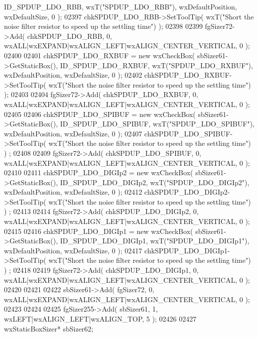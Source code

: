 \begin{DoxyCode}
      ID_SPDUP_LDO_RBB, wxT(\textcolor{stringliteral}{"SPDUP\_LDO\_RBB"}), wxDefaultPosition, wxDefaultSize, 0 );
02397     chkSPDUP_LDO_RBB->SetToolTip( wxT(\textcolor{stringliteral}{"Short the noise filter resistor to speed up the settling time"}) );
02398     
02399     fgSizer72->Add( chkSPDUP_LDO_RBB, 0, wxALL|wxEXPAND|wxALIGN\_LEFT|wxALIGN\_CENTER\_VERTICAL, 0 );
02400     
02401     chkSPDUP_LDO_RXBUF = \textcolor{keyword}{new} wxCheckBox( sbSizer61->GetStaticBox(), 
      ID_SPDUP_LDO_RXBUF, wxT(\textcolor{stringliteral}{"SPDUP\_LDO\_RXBUF"}), wxDefaultPosition, wxDefaultSize, 0 );
02402     chkSPDUP_LDO_RXBUF->SetToolTip( wxT(\textcolor{stringliteral}{"Short the noise filter resistor to speed up the settling time"}) );
02403     
02404     fgSizer72->Add( chkSPDUP_LDO_RXBUF, 0, wxALL|wxEXPAND|wxALIGN\_LEFT|wxALIGN\_CENTER\_VERTICAL, 0 );
02405     
02406     chkSPDUP_LDO_SPIBUF = \textcolor{keyword}{new} wxCheckBox( sbSizer61->GetStaticBox(), 
      ID_SPDUP_LDO_SPIBUF, wxT(\textcolor{stringliteral}{"SPDUP\_LDO\_SPIBUF"}), wxDefaultPosition, wxDefaultSize, 0 );
02407     chkSPDUP_LDO_SPIBUF->SetToolTip( wxT(\textcolor{stringliteral}{"Short the noise filter resistor to speed up the settling time"}) )
      ;
02408     
02409     fgSizer72->Add( chkSPDUP_LDO_SPIBUF, 0, wxALL|wxEXPAND|wxALIGN\_LEFT|wxALIGN\_CENTER\_VERTICAL, 0 );
02410     
02411     chkSPDUP_LDO_DIGIp2 = \textcolor{keyword}{new} wxCheckBox( sbSizer61->GetStaticBox(), 
      ID_SPDUP_LDO_DIGIp2, wxT(\textcolor{stringliteral}{"SPDUP\_LDO\_DIGIp2"}), wxDefaultPosition, wxDefaultSize, 0 );
02412     chkSPDUP_LDO_DIGIp2->SetToolTip( wxT(\textcolor{stringliteral}{"Short the noise filter resistor to speed up the settling time"}) )
      ;
02413     
02414     fgSizer72->Add( chkSPDUP_LDO_DIGIp2, 0, wxALL|wxEXPAND|wxALIGN\_LEFT|wxALIGN\_CENTER\_VERTICAL, 0 );
02415     
02416     chkSPDUP_LDO_DIGIp1 = \textcolor{keyword}{new} wxCheckBox( sbSizer61->GetStaticBox(), 
      ID_SPDUP_LDO_DIGIp1, wxT(\textcolor{stringliteral}{"SPDUP\_LDO\_DIGIp1"}), wxDefaultPosition, wxDefaultSize, 0 );
02417     chkSPDUP_LDO_DIGIp1->SetToolTip( wxT(\textcolor{stringliteral}{"Short the noise filter resistor to speed up the settling time"}) )
      ;
02418     
02419     fgSizer72->Add( chkSPDUP_LDO_DIGIp1, 0, wxALL|wxEXPAND|wxALIGN\_LEFT|wxALIGN\_CENTER\_VERTICAL, 0 );
02420     
02421     
02422     sbSizer61->Add( fgSizer72, 0, wxALL|wxEXPAND|wxALIGN\_LEFT|wxALIGN\_CENTER\_VERTICAL, 0 );
02423     
02424     
02425     fgSizer255->Add( sbSizer61, 1, wxLEFT|wxALIGN\_LEFT|wxALIGN\_TOP, 5 );
02426     
02427     wxStaticBoxSizer* sbSizer62;

\end{DoxyCode}
